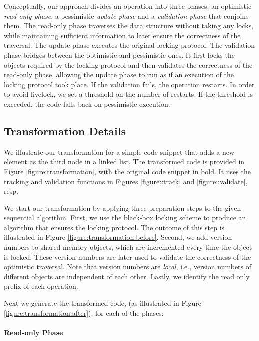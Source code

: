 Conceptually, our approach divides an operation into three phases: an optimistic \emph{read-only phase},
a pessimistic \emph{update phase} and a \emph{validation phase} that conjoins them. 
The read-only phase traverses the data structure without taking any locks, while maintaining sufficient information to later ensure the correctness of the traversal.
The update phase executes the original locking protocol. 
The validation phase bridges between the optimistic and pessimistic ones.
It first locks the objects required by
the locking protocol and then validates the correctness
of the read-only phase, allowing the 
update phase to run as if an execution of the locking
protocol took place. If the validation fails, the operation 
restarts. In order to avoid livelock, we set a threshold on the number of restarts.
If the threshold is exceeded, the code falls back on pessimistic execution. 

\subsection{Transformation Details}\label{ssec:transformation}
We illustrate our transformation for a simple code snippet that adds a new element as the third node in a linked list.
The transformed code is provided in Figure \ref{figure:transformation}, with the original code snippet in bold. It uses
the tracking and validation functions in Figures \ref{figure::track} and 
\ref{figure::validate}, resp.

We start our transformation by applying three preparation steps
to the given sequential algorithm.
First, we use the black-box locking scheme to produce an
algorithm that ensures the locking protocol. The outcome of this step is illustrated in Figure \ref{figure:transformation:before}. 
Second, we add version numbers to shared memory objects, which are 
incremented every time the object is locked. 
These version numbers are later used to validate the correctness of the optimistic traversal.
Note that version numbers are \emph{local}, i.e., version numbers of different objects are independent of each other. 
Lastly, we identify the read only prefix of each operation.

Next we generate the transformed code, (as illustrated in Figure \ref{figure:transformation:after}), 
for each of the phases:

\paragraph{Read-only Phase} 

